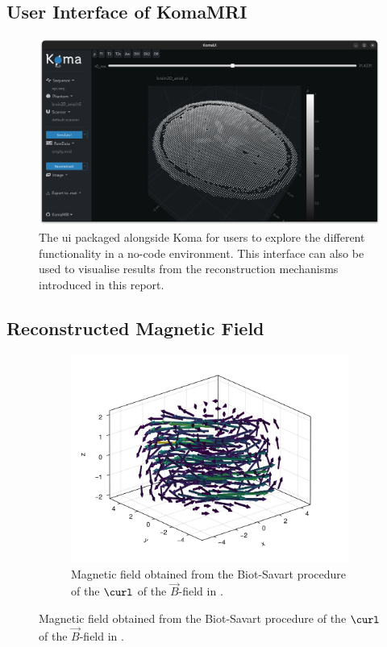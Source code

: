 \documentclass[10pt]{article}
\begin{document}
  \subsection{User Interface of KomaMRI}
  \begin{figure}[H]
    \centering
    \includegraphics[width=\linewidth]{../figures/komaui.png}
    \caption{The \gls{ui} packaged alongside Koma for users to explore the different functionality in a no-code environment. This interface can also be used to visualise results from the reconstruction mechanisms introduced in this report.}
    \label{fig:komaui}
  \end{figure}

  \subsection{Reconstructed Magnetic Field}
  \begin{figure}[H]
    \centering
    \begin{subfigure}[t]{0.6\textwidth}
      \centering
      \includegraphics[width=\textwidth]{../figures/cdpbr-b-field.pdf}
      \caption{Magnetic field obtained from the Biot-Savart procedure of the $\curl$ of the $\vec{B}$-field in .}
      \label{fig:cdpbr-b-field}
    \end{subfigure}
  \end{figure}
\end{document}
